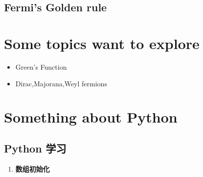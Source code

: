 \documentclass[letterpaper,10pt,english]{sphinxmanual}
\begin{document}
\section{Fermi's Golden rule}
\label{CMP/Fermi's_Golden_rule:id1}\label{CMP/Fermi's_Golden_rule::doc}\label{CMP/Fermi's_Golden_rule:fermi-s-golden-rule}

\chapter{Some topics want to explore}
\label{index:some-topics-want-to-explore}\begin{itemize}
\item {} 
Green's Function

\item {} 
Dirac,Majorana,Weyl fermions

\end{itemize}


\chapter{Something about Python}
\label{index:something-about-python}

\section{Python 学习}
\label{Python/note:python}\label{Python/note::doc}\label{Python/note:id1}\begin{enumerate}
\item {} 
\textbf{数组初始化}

\end{enumerate}
\end{document}
